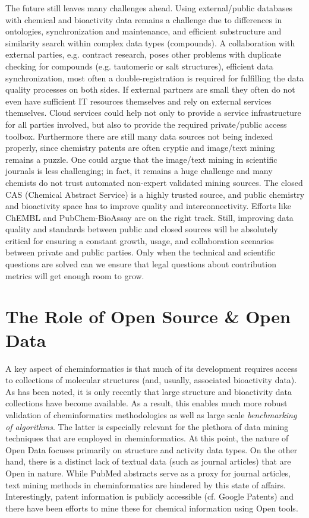 \documentclass{sig-alternate}
\begin{document}
The future still leaves many challenges ahead. Using external/public databases
with chemical and bioactivity data remains a challenge due to differences in
ontologies, synchronization and maintenance, and efficient
substructure and similarity search within complex data types
(compounds). A
collaboration with external parties, e.g. contract research, poses other
problems with duplicate checking for compounds (e.g. tautomeric or salt
structures), efficient data synchronization, most often a double-registration is
required for fulfilling the data quality processes on both sides. If external
partners are small they often do not even have sufficient IT resources
themselves and rely on external services themselves. Cloud services could help
not only to provide a service infrastructure for all parties involved,
but also to provide the required private/public access toolbox. Furthermore
there are still many data sources not being indexed properly, since chemistry
patents are often cryptic and image/text mining remains a puzzle. One could
argue that the image/text mining in scientific journals is less challenging; in
fact, it remains a huge challenge and many chemists do not trust automated
non-expert validated mining sources. The closed CAS (Chemical Abstract Service)
is a highly trusted source, and public chemistry and bioactivity space has to
improve quality and interconnectivity. Efforts like ChEMBL and PubChem-BioAssay
are on the right track. Still, improving data quality and standards between
public and closed sources will be absolutely critical for ensuring a constant
growth, usage, and collaboration scenarios between private and public parties.
Only when the technical and scientific questions are solved can we ensure that
legal questions about contribution metrics will get enough room to grow.

\section{The Role of Open Source \& Open Data}
\label{sec:role-open-source}

A key aspect of cheminformatics is that much of its development
requires access to collections of molecular structures (and, usually,
associated bioactivity data). As has been noted, it is only recently
that large structure and bioactivity data collections have become
available. As a result, this enables much more robust validation of
cheminformatics methodologies as well as large scale \emph{benchmarking of
algorithms}. The latter is especially relevant for the plethora of
data mining techniques that are employed in cheminformatics. At this
point, the nature of Open Data focuses primarily on structure and
activity data types. On the other hand, there is a distinct lack of
textual data (such as journal articles) that are Open in nature. While
PubMed abstracts serve as a proxy for journal articles, text mining
methods in cheminformatics are hindered by this state of affairs.
Interestingly, patent information is publicly accessible (cf. Google
Patents) and there have been efforts to mine these for chemical
information using Open tools.
\end{document}
